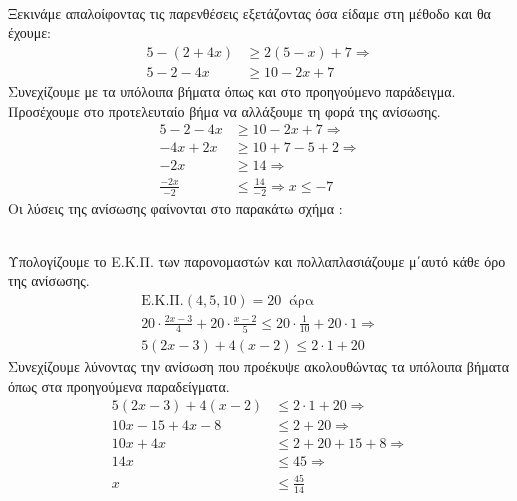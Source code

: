 \documentclass[twoside,nofonts,internet,methodoi]{thewria}
\begin{document}
\\\\
\lysh\\
Ξεκινάμε απαλοίφοντας τις παρενθέσεις εξετάζοντας όσα είδαμε στη μέθοδο και θα έχουμε:
\begin{align*}
5-(2+4x)&\geq 2(5-x)+7\Rightarrow\\
5-2-4x&\geq 10-2x+7
\end{align*}
Συνεχίζουμε με τα υπόλοιπα βήματα όπως και στο προηγούμενο παράδειγμα. Προσέχουμε στο προτελευταίο βήμα να αλλάξουμε τη φορά της ανίσωσης.
\begin{align*}
5-2-4x&\geq 10-2x+7\Rightarrow\\
-4x+2x&\geq 10+7-5+2\Rightarrow\\
-2x&\geq 14\Rightarrow\\
\frac{-2x}{-2}&\leq \frac{14}{-2}\Rightarrow x\leq -7
\end{align*}
Οι λύσεις της ανίσωσης φαίνονται στο παρακάτω σχήμα : \begin{center}
\end{center}
\lysh\\
Υπολογίζουμε το Ε.Κ.Π. των παρονομαστών και πολλαπλασιάζουμε μ΄αυτό κάθε όρο της ανίσωσης.
\begin{gather*}
\textrm{Ε.Κ.Π.}(4,5,10)=20\ \textrm{ άρα}\\
20\cdot\frac{2x-3}{4}+20\cdot\frac{x-2}{5}\leq20\cdot\frac{1}{10}+20\cdot 1\Rightarrow\\
5(2x-3)+4(x-2)\leq 2\cdot 1+20
\end{gather*}
Συνεχίζουμε λύνοντας την ανίσωση που προέκυψε ακολουθώντας τα υπόλοιπα βήματα όπως στα προηγούμενα παραδείγματα.
\begin{align*}
5(2x-3)+4(x-2)&\leq 2\cdot 1+20\Rightarrow\\
10x-15+4x-8&\leq 2+20\Rightarrow\\
10x+4x&\leq 2+20+15+8\Rightarrow\\
14x&\leq 45\Rightarrow\\ x&\leq \frac{45}{14}
\end{align*}
\end{document}
